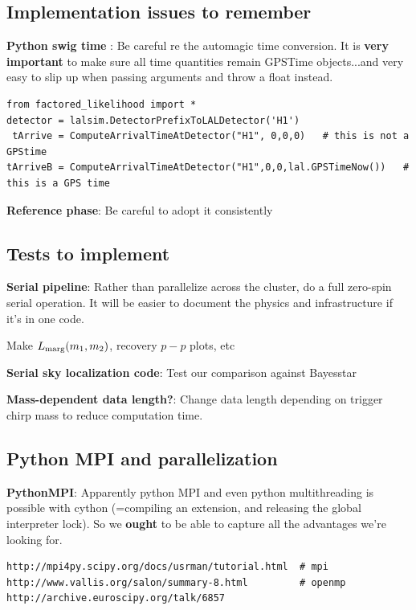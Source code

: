 \documentclass[twocolumn,prd,nofootinbib]{revtex4}
\begin{document}
\subsection{Implementation issues to remember}



\noindent \textbf{Python swig time }: Be careful re the automagic time conversion. It is \textbf{very important} to make
sure all time quantities remain GPSTime objects...and very easy to slip up when passing arguments and throw a float
instead.  
\begin{shaded}
\begin{verbatim}
from factored_likelihood import *
detector = lalsim.DetectorPrefixToLALDetector('H1')
 tArrive = ComputeArrivalTimeAtDetector("H1", 0,0,0)   # this is not a GPStime
tArriveB = ComputeArrivalTimeAtDetector("H1",0,0,lal.GPSTimeNow())   # this is a GPS time
\end{verbatim}
\end{shaded}

\noindent \textbf{Reference phase}: Be careful to adopt it consistently

\subsection{Tests to implement}
\noindent \textbf{Serial pipeline}: Rather than parallelize across the cluster, do a full zero-spin serial operation.
It will be easier to document the physics and infrastructure if it's in one code.

Make $L_{\rm marg}(m_1,m_2)$, recovery $p-p$ plots, etc

\noindent \textbf{Serial sky localization code}: Test our comparison against Bayesstar

\noindent \textbf{Mass-dependent data length?}: Change data length depending on trigger chirp mass to reduce computation time.


\subsection{Python MPI and parallelization}

\noindent \textbf{PythonMPI}: Apparently python MPI and even python multithreading is possible with cython (=compiling an extension, and releasing the
global interpreter lock).  So we \textbf{ought} to be able to capture all the advantages we're looking for.
\begin{verbatim}
http://mpi4py.scipy.org/docs/usrman/tutorial.html  # mpi
http://www.vallis.org/salon/summary-8.html         # openmp
http://archive.euroscipy.org/talk/6857
\end{verbatim}
\end{document}
